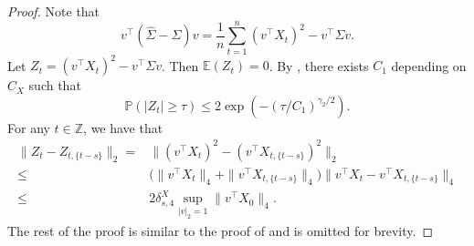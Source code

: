 \documentclass[11pt]{article}
\newcommand{\E}{ { \mathbb{E} } }
\newcommand{\p}{\mathbb P}
\theoremstyle{plain}
\theoremstyle{definition}
\begin{document}
 
 
\begin{proof} 
Note   that 
$$v^\top (\widehat \Sigma -\Sigma )v  = \frac{1}{n} \sum_{t =1}^n ( v^\top X_t  )^2 -v^\top \Sigma v .  $$
Let $Z_t =  ( v^\top X_t  )^2 -v^\top \Sigma v$.
Then 
$\E(Z_t) =0$.  
By ,  there exists $C_1$  depending on $ C_X$   such that
 $$\p ( |Z_t  | \ge \tau) \le 2 \exp(- (\tau/C_1)^ {\gamma_2/2}).$$
For any $ t\in \mathbb Z$, we have that
 \begin{align*} 
 \|Z_t - Z_{t,\{ t-s\}} \|_2 =  &  \| ( v^\top X_t  )^2  - ( v^\top X_{t, \{t-s\}}   )^2    \|_2
 \\
 \le &  \big  ( \|   v^\top X_t   \|_4  +  \| v^\top X_{t, \{t-s\}}       \|_4  \big ) \|   v^\top X_t  - v^\top X_{t, \{t-s\}}       \|_4
 \\
 \le & 2 \delta  ^X_{s ,4}   \sup_{|v|_2 = 1}\|v^{\top}X_{0}\|_4.
 \end{align*}
The rest of the proof is similar to the proof of   and is omitted for brevity. 
\end{proof}  
\end{document}
